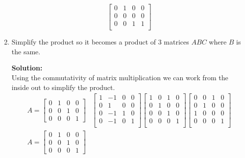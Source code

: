\documentclass[12pt]{article}
\makeatletter
\theoremstyle{homework}
\newenvironment{exercise}[1]
{\def\@currentlabel{#1}\exercisecore}
{\endexercisecore}
\newcommand{\localhead}[1]{\par\smallskip\noindent\textbf{#1}\nobreak\\}%
\newcommand\solution{\localhead{Solution:}}
\makeatother
\begin{document}
\begin{exercise}{4}
\begin{enumerate}
\begin{equation*}
\begin{bmatrix}
                0 & 1 & 0 & 0\\
                0 & 0 & 0 & 0\\
                0 & 0 & 1 & 1\\
            \end{bmatrix}
        \end{equation*}
        \item Simplify the product so it becomes a product of 3 matrices $ABC$ where $B$ is the same. \\
        \solution Using the commutativity of matrix multiplication we can work from the inside out to simplify the product. 
        \begin{align*}
            A = 
            \begin{bmatrix}
                0 & 1 & 0 & 0\\
                0 & 0 & 1 & 0\\
                0 & 0 & 0 & 1
            \end{bmatrix}
            &
            \begin{bmatrix}
                1 & -1 & 0 & 0\\
                0 & 1 & 0 & 0\\
                0 & -1 & 1 & 0\\
                0 & -1 & 0 & 1\\
            \end{bmatrix}
            \begin{bmatrix}
                1 & 0 & 1 & 0\\
                0 & 1 & 0 & 0\\
                0 & 0 & 1 & 0\\
                0 & 0 & 0 & 1\\
            \end{bmatrix}
            \begin{bmatrix}
                0 & 0 & 1 & 0\\
                0 & 1 & 0 & 0\\
                1 & 0 & 0 & 0\\
                0 & 0 & 0 & 1\\
            \end{bmatrix}\\
            A = 
            \begin{bmatrix}
                0 & 1 & 0 & 0\\
                0 & 0 & 1 & 0\\
                0 & 0 & 0 & 1

\end{bmatrix}
\end{align*}
\end{enumerate}
\end{exercise}
\end{document}
